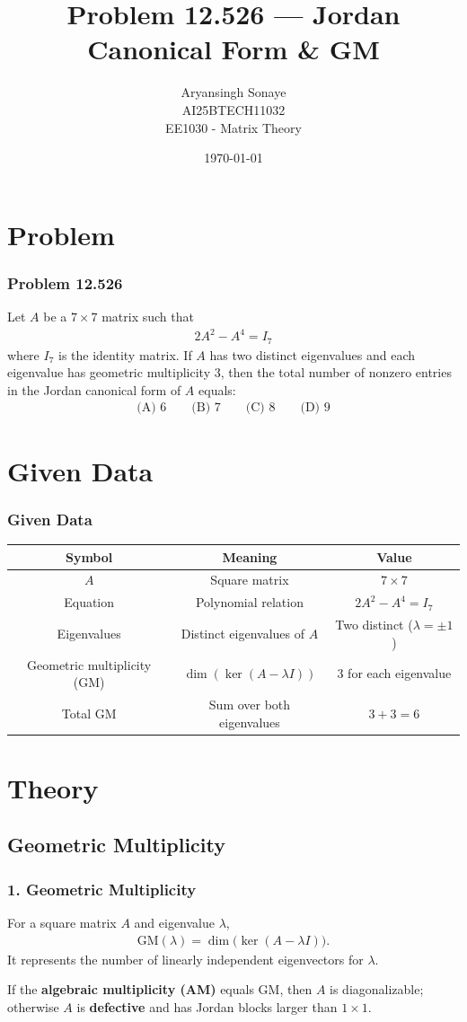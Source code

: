 \documentclass{beamer}
\title{Problem 12.526 — Jordan Canonical Form \& GM}
\author{Aryansingh Sonaye \\ AI25BTECH11032 \\ EE1030 - Matrix Theory}
\date{\today}
\numberwithin{equation}{section}
\begin{document}
\begin{frame}
\titlepage
\end{frame}

\section{Problem}
\begin{frame}
\frametitle{Problem 12.526}
Let $A$ be a $7\times7$ matrix such that 
\begin{align}
2A^2 - A^4 = I_7
\end{align}
where $I_7$ is the identity matrix. If $A$ has two distinct eigenvalues and each eigenvalue has geometric multiplicity $3$, then the total number of nonzero entries in the Jordan canonical form of $A$ equals:
\begin{align*}
\text{(A) } 6 \qquad \text{(B) } 7 \qquad \text{(C) } 8 \qquad \text{(D) } 9
\end{align*}
\end{frame}

\section{Given Data}
\begin{frame}
\frametitle{Given Data}
\begin{table}[H]\centering
\renewcommand{\arraystretch}{1.4}
\begin{tabular}{|c|c|c|}
\hline
\textbf{Symbol} & \textbf{Meaning} & \textbf{Value} \\
\hline
$A$ & Square matrix & $7\times7$ \\
\hline
Equation & Polynomial relation & $2A^2 - A^4 = I_7$ \\
\hline
Eigenvalues & Distinct eigenvalues of $A$ & Two distinct ($\lambda=\pm1$) \\
\hline
Geometric multiplicity (GM) & $\dim(\ker(A-\lambda I))$ & $3$ for each eigenvalue \\
\hline
Total GM & Sum over both eigenvalues & $3+3=6$ \\
\hline
\end{tabular}
\end{table}
\end{frame}

\section{Theory}
\subsection{Geometric Multiplicity}
\begin{frame}
\frametitle{1. Geometric Multiplicity}
For a square matrix $A$ and eigenvalue $\lambda$,
\begin{align}
\text{GM}(\lambda) = \dim\!\big(\ker(A-\lambda I)\big).
\end{align}
It represents the number of linearly independent eigenvectors for $\lambda$.

If the \textbf{algebraic multiplicity (AM)} equals GM, then $A$ is diagonalizable; otherwise $A$ is \textbf{defective} and has Jordan blocks larger than $1\times1$.
\end{frame}
\end{document}

